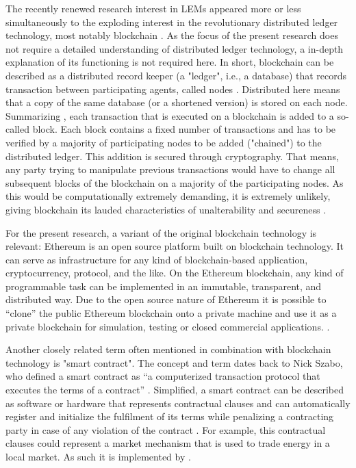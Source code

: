 The recently renewed research interest in LEMs appeared more or less simultaneously to the exploding interest in the revolutionary distributed ledger technology, most notably blockchain \citep{Swan:2015}. As the focus of the present research does not require a detailed understanding of distributed ledger technology, a in-depth explanation of its functioning is not required here. In short, blockchain can be described as a distributed record keeper (a "ledger", i.e., a database) that records transaction between participating agents, called nodes \citep{Burger:2016}. Distributed here means that a copy of the same database (or a shortened version) is stored on each node. Summarizing \citet{Tapscott:2016}, each transaction that is executed on a blockchain is added to a so-called block. Each block contains a fixed number of transactions and has to be verified by a majority of participating nodes to be added ("chained") to the distributed ledger. This addition is secured through cryptography. That means, any party trying to manipulate previous transactions would have to change all subsequent blocks of the blockchain on a majority of the participating nodes. As this would be computationally extremely demanding, it is extremely unlikely, giving blockchain its lauded characteristics of unalterability and secureness \citep{Burger:2016}.

For the present research, a variant of the original blockchain technology is relevant: Ethereum is an open source platform built on blockchain technology. It can serve as infrastructure for any kind of blockchain-based application, cryptocurrency, protocol, and the like. On the Ethereum blockchain, any kind of programmable task can be implemented in an immutable, transparent, and distributed way. Due to the open source nature of Ethereum it is possible to “clone” the public Ethereum blockchain onto a private machine and use it as a private blockchain for simulation, testing or closed commercial applications. \citep{Ethereum:2018doc, Swan:2015}.

Another closely related term often mentioned in combination with blockchain technology is "smart contract". The concept and term dates back to Nick Szabo, who defined a smart contract as “a computerized transaction protocol that executes the terms of a contract” \citep{szabo:1994}. Simplified, a smart contract can be described as software or hardware that represents contractual clauses and can automatically register and initialize the fulfilment of its terms while penalizing a contracting party in case of any violation of the contract \citep{Szabo:1997}. For example, this contractual clauses could represent a market mechanism that is used to trade energy in a local market. As such it is implemented by \citet{Mengelkamp:2018a}.


